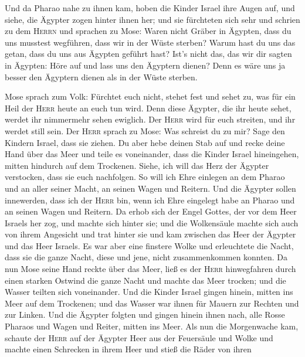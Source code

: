  Und da Pharao nahe zu ihnen kam, hoben die Kinder Israel
ihre Augen auf, und siehe, die Ägypter zogen hinter ihnen her; und sie
fürchteten sich sehr und schrien zu dem \textsc{Herrn} 
und sprachen zu Mose: Waren nicht Gräber in Ägypten, dass du uns
musstest wegführen, dass wir in der Wüste sterben? Warum hast du uns das
getan, dass du uns aus Ägypten geführt hast?  Ist's nicht
das, das wir dir sagten in Ägypten: Höre auf und lass uns den Ägyptern
dienen? Denn es wäre uns ja besser den Ägyptern dienen als in der Wüste
sterben.

 Mose sprach zum Volk: Fürchtet euch nicht, stehet fest
und sehet zu, was für ein Heil der \textsc{Herr} heute an euch tun wird.
Denn diese Ägypter, die ihr heute sehet, werdet ihr nimmermehr sehen
ewiglich.  Der \textsc{Herr} wird für euch streiten, und
ihr werdet still sein.  Der \textsc{Herr} sprach zu Mose:
Was schreist du zu mir? Sage den Kindern Israel, dass sie ziehen.
 Du aber hebe deinen Stab auf und recke deine Hand über
das Meer und teile es voneinander, dass die Kinder Israel hineingehen,
mitten hindurch auf dem Trockenen.  Siehe, ich will das
Herz der Ägypter verstocken, dass sie euch nachfolgen. So will ich Ehre
einlegen an dem Pharao und an aller seiner Macht, an seinen Wagen und
Reitern.  Und die Ägypter sollen innewerden, dass ich der
\textsc{Herr} bin, wenn ich Ehre eingelegt habe an Pharao und an seinen
Wagen und Reitern.  Da erhob sich der Engel Gottes, der
vor dem Heer Israels her zog, und machte sich hinter sie; und die
Wolkensäule machte sich auch von ihrem Angesicht und trat hinter sie
 und kam zwischen das Heer der Ägypter und das Heer
Israels. Es war aber eine finstere Wolke und erleuchtete die Nacht, dass
sie die ganze Nacht, diese und jene, nicht zusammenkommen konnten.
 Da nun Mose seine Hand reckte über das Meer, ließ es der
\textsc{Herr} hinwegfahren durch einen starken Ostwind die ganze Nacht
und machte das Meer trocken; und die Wasser teilten sich voneinander.
 Und die Kinder Israel gingen hinein, mitten ins Meer auf
dem Trockenen; und das Wasser war ihnen für Mauern zur Rechten und zur
Linken.  Und die Ägypter folgten und gingen hinein ihnen
nach, alle Rosse Pharaos und Wagen und Reiter, mitten ins Meer.
 Als nun die Morgenwache kam, schaute der \textsc{Herr}
auf der Ägypter Heer aus der Feuersäule und Wolke und machte einen
Schrecken in ihrem Heer  und stieß die Räder von ihren
